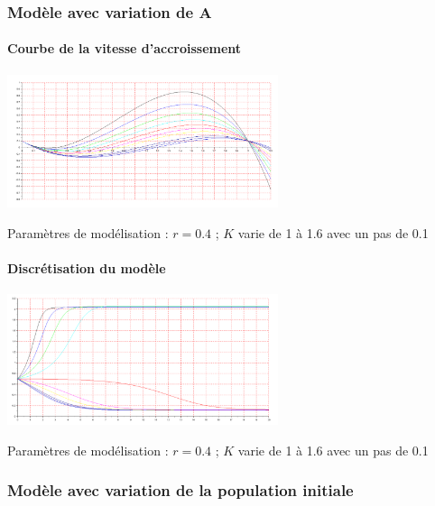 \documentclass{article}
\begin{document}
\subsubsection{Modèle avec variation de A}

\paragraph{Courbe de la vitesse d'accroissement}
\begin{center}
\includegraphics[width=300px]{img/part1/AlleeA.png}
\end{center}
Paramètres de modélisation : $r=0.4$  ; $K$ varie de 1 à 1.6 avec un pas de 0.1
\paragraph{}

\paragraph{Discrétisation du modèle}
\begin{center}
\includegraphics[width=300px]{img/part1/TrajA.png}
\end{center}
Paramètres de modélisation : $r=0.4$  ; $K$ varie de 1 à 1.6 avec un pas de 0.1
\paragraph{}

\subsubsection{Modèle avec variation de la population initiale}
\end{document}
